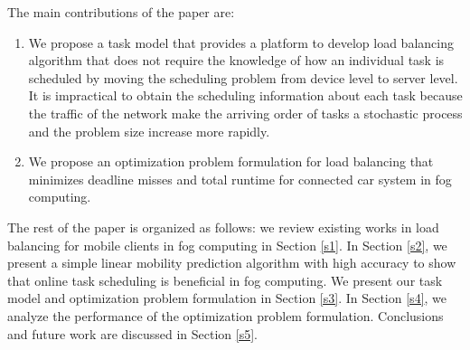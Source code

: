 The main contributions of the paper are:

\begin{enumerate}
\item We propose a task model that provides a platform to develop load balancing algorithm that does not require the knowledge of how an individual task is scheduled by moving the scheduling problem from device level to server level. It is impractical to obtain the scheduling information about each task because the traffic of the network make the arriving order of tasks a stochastic process and the problem size increase more rapidly.
\item We propose an optimization problem formulation for load balancing that minimizes deadline misses and total runtime for connected car system in fog computing.
\end{enumerate}

The rest of the paper is organized as follows: we review existing works in load balancing for mobile clients in fog computing in Section \ref{s1}. In Section \ref{s2}, we present a simple linear mobility prediction algorithm with high accuracy to show that online task scheduling is beneficial in fog computing. We present our task model and optimization problem formulation in Section \ref{s3}. In Section \ref{s4}, we analyze the performance of the optimization problem formulation. Conclusions and future work are discussed in Section \ref{s5}.


\iffalse

Mobility of the clients is also a feature that should be addressed. In cloud computing, location is sometimes taken into consideration to improve performance such as Akamai\cite{aka}.

\fi
